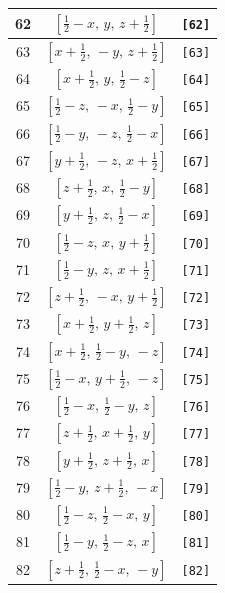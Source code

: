 \documentclass[fleqn,8pt]{jsarticle}
\begin{document}
\begin{longtable}{ccc}
62 & $\left[ \frac{1}{2} - x,\, y,\, z + \frac{1}{2} \right]$ & {\tt [62]} \\ \hline
63 & $\left[ x + \frac{1}{2},\, - y,\, z + \frac{1}{2} \right]$ & {\tt [63]} \\ \hline
64 & $\left[ x + \frac{1}{2},\, y,\, \frac{1}{2} - z \right]$ & {\tt [64]} \\ \hline
65 & $\left[ \frac{1}{2} - z,\, - x,\, \frac{1}{2} - y \right]$ & {\tt [65]} \\ \hline
66 & $\left[ \frac{1}{2} - y,\, - z,\, \frac{1}{2} - x \right]$ & {\tt [66]} \\ \hline
67 & $\left[ y + \frac{1}{2},\, - z,\, x + \frac{1}{2} \right]$ & {\tt [67]} \\ \hline
68 & $\left[ z + \frac{1}{2},\, x,\, \frac{1}{2} - y \right]$ & {\tt [68]} \\ \hline
69 & $\left[ y + \frac{1}{2},\, z,\, \frac{1}{2} - x \right]$ & {\tt [69]} \\ \hline
70 & $\left[ \frac{1}{2} - z,\, x,\, y + \frac{1}{2} \right]$ & {\tt [70]} \\ \hline
71 & $\left[ \frac{1}{2} - y,\, z,\, x + \frac{1}{2} \right]$ & {\tt [71]} \\ \hline
72 & $\left[ z + \frac{1}{2},\, - x,\, y + \frac{1}{2} \right]$ & {\tt [72]} \\ \hline
73 & $\left[ x + \frac{1}{2},\, y + \frac{1}{2},\, z \right]$ & {\tt [73]} \\ \hline
74 & $\left[ x + \frac{1}{2},\, \frac{1}{2} - y,\, - z \right]$ & {\tt [74]} \\ \hline
75 & $\left[ \frac{1}{2} - x,\, y + \frac{1}{2},\, - z \right]$ & {\tt [75]} \\ \hline
76 & $\left[ \frac{1}{2} - x,\, \frac{1}{2} - y,\, z \right]$ & {\tt [76]} \\ \hline
77 & $\left[ z + \frac{1}{2},\, x + \frac{1}{2},\, y \right]$ & {\tt [77]} \\ \hline
78 & $\left[ y + \frac{1}{2},\, z + \frac{1}{2},\, x \right]$ & {\tt [78]} \\ \hline
79 & $\left[ \frac{1}{2} - y,\, z + \frac{1}{2},\, - x \right]$ & {\tt [79]} \\ \hline
80 & $\left[ \frac{1}{2} - z,\, \frac{1}{2} - x,\, y \right]$ & {\tt [80]} \\ \hline
81 & $\left[ \frac{1}{2} - y,\, \frac{1}{2} - z,\, x \right]$ & {\tt [81]} \\ \hline
82 & $\left[ z + \frac{1}{2},\, \frac{1}{2} - x,\, - y \right]$ & {\tt [82]} \\ \hline

\end{longtable}
\end{document}
